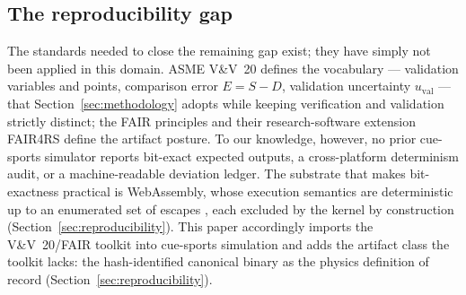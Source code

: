 \subsection{The reproducibility gap}

The standards needed to close the remaining gap exist; they have simply
not been applied in this domain. ASME V\&V~20 \citep{asme2009vv20}
defines the vocabulary --- validation variables and points, comparison
error $E = S - D$, validation uncertainty $u_{\mathrm{val}}$ --- that
Section~\ref{sec:methodology} adopts while keeping verification and
validation strictly distinct; the FAIR principles \citep{wilkinson2016fair}
and their research-software extension FAIR4RS \citep{chuehong2022fair4rs}
define the artifact posture. To our knowledge, however, no prior
cue-sports simulator reports bit-exact expected outputs, a
cross-platform determinism audit, or a machine-readable deviation ledger.
The substrate that makes bit-exactness practical is WebAssembly, whose
execution semantics are deterministic up to an enumerated set of escapes
\citep{wasm2015nondeterminism}, each excluded by the kernel by
construction (Section~\ref{sec:reproducibility}). This paper accordingly imports the
V\&V~20/FAIR toolkit into cue-sports simulation and adds the artifact
class the toolkit lacks: the hash-identified canonical binary as the
physics definition of record (Section~\ref{sec:reproducibility}).
